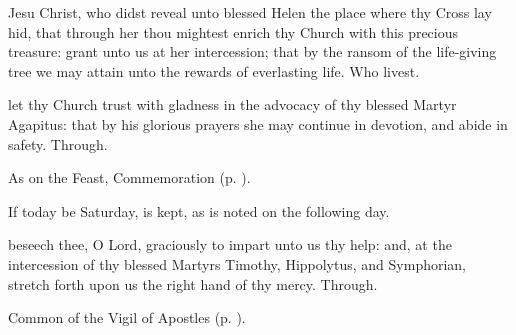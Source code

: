
\memorialCollect
{} Jesu Christ, who didst reveal unto blessed Helen the place where thy Cross lay hid, that through her thou mightest enrich thy Church with this precious treasure: grant unto us at her intercession; that by the ransom of the life-giving tree we may attain unto the rewards of everlasting life. Who livest.



\memorialCollect
{} let thy Church trust with gladness in the advocacy of thy blessed Martyr Agapitus: that by his glorious prayers she may continue in devotion, and abide in safety. Through.



\begin{rubric}
	As on the Feast, Commemoration  (p. \pageref{TimothyHippolytusSymphorianCollect}).
\end{rubric}
\begin{rubric}
	If today be Saturday,  is kept, as is noted on the following day.
\end{rubric}



\memorialCollect\label{TimothyHippolytusSymphorianCollect}
 beseech thee, O Lord, graciously to impart unto us thy help: and, at the intercession of thy blessed Martyrs Timothy, Hippolytus, and Symphorian, stretch forth upon us the right hand of thy mercy. Through.


\clearpage
{}

\begin{rubric}
	Common of the Vigil of Apostles (p. \pageref{CommonVigilApostles}).
\end{rubric}



